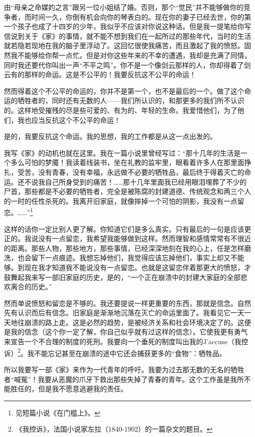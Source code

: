 由“母亲之命媒妁之言”跟另一位小姐结了婚。否则，那个“觉民”并不能够做你的竞争者，而时间一久，你倒有机会向你的琴表白的。现在你的妻子已经去世，你的第一个孩子也成了十四岁的少年，我似乎不应该对你说这种话。但是我一提笔给你写信说到关于《家》的事情，就不能不想到我们在一起所过的那些年代，当时的生活就若隐若现地在我的脑子里浮动了。这回忆很使我痛苦，而且激起了我的愤怒。固然我不能够给你帮一点忙。但是对你这些年来的不幸的遭遇，我却是充满了同情，同时我还要代你叫出一声“不平之鸣”。你不是一个像剑云那样的人，你却得着了剑云有的那样的命运。这是不公平的！我要反抗这不公平的命运！
\par 然而得着这个不公平的命运的，你并不是第一个，也不是最后的一个。做了这个命运的牺牲者的，同时还有无数的人——我们所认识的，和那更多的我们所不认识的。这样地受摧残的尽是些可爱的、有为的、年轻的生命。我爱惜他们，为了他们，我也应当反抗这个不公平的命运！
\par 是的，我要反抗这个命运。我的思想，我的工作都是从这一点出发的。
\par 我写《家》的动机也就在这里。我在一篇小说里曾经写过：“那十几年的生活是一个多么可怕的梦魇！我读着线装书，坐在礼教的监牢里，眼看着许多人在那里面挣扎，受苦，没有青春，没有幸福，永远做不必要的牺牲品，最后终于得着灭亡的命运。还不说我自己所身受到的痛苦！……那十几年里面我已经用眼泪埋葬了不少的尸首，那些都是不必要的牺牲者，完全是被陈腐的封建道德、传统观念和两三个人的一时的任性杀死的。我离开旧家庭，就像摔掉一个可怕的阴影，我没有一点留恋。……”\footnote{见短篇小说《在门槛上》。}
\par 这样的话你一定比别人更了解。你知道它们是多么真实。只有最后的一句是应该更正的。我说没有一点留恋，我希望我能够做到这样。然而理智和感情常常有不很近的距离。那些人物，那些地方，那些事情，已经深深地刻在我的心上，任是怎样磨洗，也会留下一点痕迹。我想忘掉他们，我觉得应该忘掉他们，事实上却又不能够。到现在我才知道我不能说没有一点留恋。也就是这留恋伴着那更大的愤怒，才鼓舞起我来写一部旧家庭的历史，是的，“一个正在崩溃中的封建大家庭的全部悲欢离合的历史。”
\par 然而单说愤怒和留恋是不够的。我还要提说一样更重要的东西，那就是信念。自然先有认识而后有信念。旧家庭是渐渐地沉落在灭亡的命运里面了。我看见它一天一天地往崩溃的路上走。这是必然的趋势，是被经济关系和社会环境决定了的。这便是我的信念（这个你一定了解，你自己似乎就有过这样的信念）。它使我更有勇气来宣告一个不合理的制度的死刑。我要向一个垂死的制度叫出我的J’accuse（我控诉）\footnote{《我控诉》，法国小说家左拉（1840-1902）的一篇杂文的题目。}。我不能忘记甚至在崩溃的途中它还会捕获更多的“食物”：牺牲品。
\par 所以我要写一部《家》来作为一代青年的呼吁。我要为过去那无数的无名的牺牲者“喊冤”！我要从恶魔的爪牙下救出那些失掉了青春的青年。这个工作虽是我所不能胜任的，但是我不愿意逃避我的责任。
